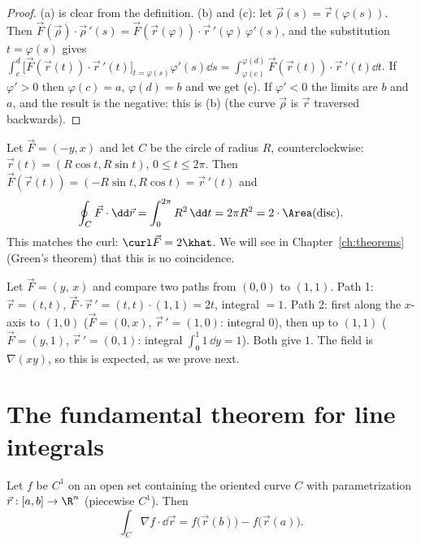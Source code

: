 \begin{proof}
(a) is clear from the definition. (b) and (c): let $\vec\rho(s)=\vec r(\varphi(s))$. Then $\vec F(\vec\rho)\cdot\vec\rho\,'(s)=\vec F(\vec r(\varphi))\cdot\vec r\,'(\varphi)\,\varphi'(s)$, and the substitution $t=\varphi(s)$ gives $\int_c^d\bigl[\vec F(\vec r(t))\cdot\vec r\,'(t)\bigr]_{t=\varphi(s)}\varphi'(s)\dd s=\int_{\varphi(c)}^{\varphi(d)}\vec F(\vec r(t))\cdot\vec r\,'(t)\dd t$. If $\varphi'>0$ then $\varphi(c)=a$, $\varphi(d)=b$ and we get (c). If $\varphi'<0$ the limits are $b$ and $a$, and the result is the negative: this is (b) (the curve $\vec\rho$ is $\vec r$ traversed backwards).
\end{proof}

\begin{example}
Let $\vec F=(-y,x)$ and let $C$ be the circle of radius $R$, counterclockwise: $\vec r(t)=(R\cos t,R\sin t)$, $0\le t\le2\pi$. Then $\vec F(\vec r(t))=(-R\sin t,R\cos t)=\vec r\,'(t)$ and
\[
\oint_C\vec F\cdot\dd\vec r=\int_0^{2\pi}R^2\,\dd t=2\pi R^2=2\cdot\Area(\text{disc}).
\]
This matches the curl: $\curl\vec F=2\khat$. We will see in Chapter~\ref{ch:theorems} (Green's theorem) that this is no coincidence.
\end{example}

\begin{example}
Let $\vec F=(y,\,x)$ and compare two paths from $(0,0)$ to $(1,1)$. Path 1: $\vec r=(t,t)$, $\vec F\cdot\vec r\,'=(t,t)\cdot(1,1)=2t$, integral $=1$. Path 2: first along the $x$-axis to $(1,0)$ ($\vec F=(0,x)$, $\vec r\,'=(1,0)$: integral $0$), then up to $(1,1)$ ($\vec F=(y,1)$, $\vec r\,'=(0,1)$: integral $\int_0^1 1\,\dd y=1$). Both give $1$. The field is $\nabla(xy)$, so this is expected, as we prove next.
\end{example}

\section{The fundamental theorem for line integrals}

\begin{theorem}\label{thm:ftli}
Let $f$ be $C^1$ on an open set containing the oriented curve $C$ with parametrization $\vec r:[a,b]\to\R^n$ (piecewise $C^1$). Then
\[
\int_C\nabla f\cdot\dd\vec r=f\bigl(\vec r(b)\bigr)-f\bigl(\vec r(a)\bigr).
\]
\end{theorem}

